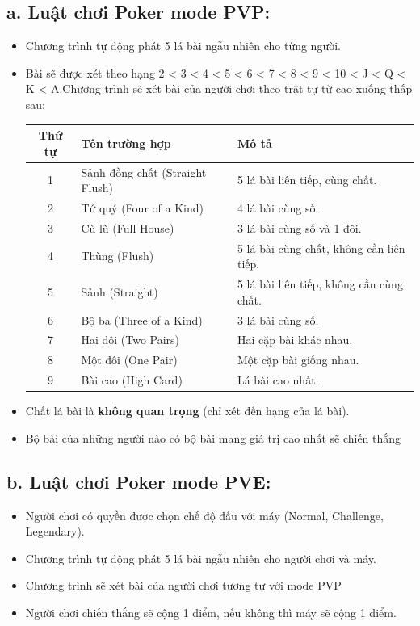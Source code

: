 \documentclass{article}
\begin{document}
\subsection{a. Luật chơi Poker mode PVP:}
\begin{itemize}
    \item Chương trình tự động phát 5 lá bài ngẫu nhiên cho từng người.
    \item Bài sẽ được xét theo hạng 2 < 3 < 4 < 5 < 6 < 7 < 8 < 9 < 10 < J < Q < K < A.Chương trình sẽ xét bài của người chơi theo trật tự từ cao xuống thấp sau:
    \begin{table}[!ht]
    \centering
    \begin{tabular}{|c|l|l|}
    \hline
        Thứ tự & Tên trường hợp & Mô tả \\ \hline
        1 & Sảnh đồng chất (Straight Flush) & 5 lá bài liên tiếp, cùng chất. \\ \hline
        2 & Tứ quý (Four of a Kind) & 4 lá bài cùng số. \\ \hline
        3 & Cù lũ (Full House) & 3 lá bài cùng số và 1 đôi. \\ \hline
        4 & Thùng (Flush) & 5 lá bài cùng chất, không cần liên tiếp. \\ \hline
        5 & Sảnh (Straight) & 5 lá bài liên tiếp, không cần cùng chất. \\ \hline
        6 & Bộ ba (Three of a Kind) & 3 lá bài cùng số. \\ \hline
        7 & Hai đôi (Two Pairs) & Hai cặp bài khác nhau. \\ \hline
        8 & Một đôi (One Pair) & Một cặp bài giống nhau. \\ \hline
        9 & Bài cao (High Card) & Lá bài cao nhất. \\ \hline
    \end{tabular}
\end{table}
    \item Chất lá bài là \textbf{không quan trọng} (chỉ xét đến hạng của lá bài).
    \item Bộ bài của những người nào có bộ bài mang giá trị cao nhất sẽ chiến thắng
\end{itemize}


\subsection{b. Luật chơi Poker mode PVE: }
\begin{itemize}
    \item Người chơi có quyền được chọn chế độ đấu với máy (Normal, Challenge, Legendary).
    \item Chương trình tự động phát 5 lá bài ngẫu nhiên cho người chơi và máy.
    \item Chương trình sẽ xét bài của người chơi tương tự với mode PVP
    \item Người chơi chiến thắng sẽ cộng 1 điểm, nếu không thì máy sẽ cộng 1 điểm.
\end{itemize}
\end{document}
